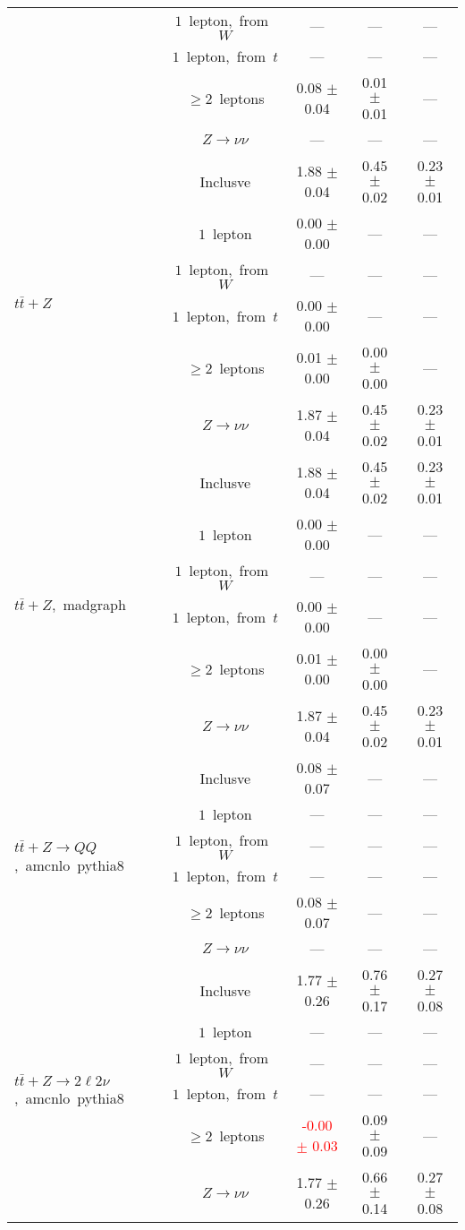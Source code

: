 \documentclass{article}
\begin{document}
\begin{longtable}{|l|c|c|c|c|}
 & $1$~lepton,~from~$W$  & ---  & ---  & --- \\* 
 & $1$~lepton,~from~$t$  & ---  & ---  & --- \\* 
 & $\ge2$~leptons  & 0.08 $\pm$ 0.04  & 0.01 $\pm$ 0.01  & --- \\* 
 & $Z\rightarrow\nu\nu$  & ---  & ---  & --- \\* 
\hline 
\multirow{6}{*}{$t\bar{t}+Z$} & Inclusve  & 1.88 $\pm$ 0.04  & 0.45 $\pm$ 0.02  & 0.23 $\pm$ 0.01 \\* 
 & $1$~lepton  & 0.00 $\pm$ 0.00  & ---  & --- \\* 
 & $1$~lepton,~from~$W$  & ---  & ---  & --- \\* 
 & $1$~lepton,~from~$t$  & 0.00 $\pm$ 0.00  & ---  & --- \\* 
 & $\ge2$~leptons  & 0.01 $\pm$ 0.00  & 0.00 $\pm$ 0.00  & --- \\* 
 & $Z\rightarrow\nu\nu$  & 1.87 $\pm$ 0.04  & 0.45 $\pm$ 0.02  & 0.23 $\pm$ 0.01 \\* 
\hline 
\multirow{6}{*}{$t\bar{t}+Z$,~madgraph} & Inclusve  & 1.88 $\pm$ 0.04  & 0.45 $\pm$ 0.02  & 0.23 $\pm$ 0.01 \\* 
 & $1$~lepton  & 0.00 $\pm$ 0.00  & ---  & --- \\* 
 & $1$~lepton,~from~$W$  & ---  & ---  & --- \\* 
 & $1$~lepton,~from~$t$  & 0.00 $\pm$ 0.00  & ---  & --- \\* 
 & $\ge2$~leptons  & 0.01 $\pm$ 0.00  & 0.00 $\pm$ 0.00  & --- \\* 
 & $Z\rightarrow\nu\nu$  & 1.87 $\pm$ 0.04  & 0.45 $\pm$ 0.02  & 0.23 $\pm$ 0.01 \\* 
\hline 
\multirow{6}{*}{$t\bar{t}+Z{\rightarrow}QQ$,~amcnlo~pythia8} & Inclusve  & 0.08 $\pm$ 0.07  & ---  & --- \\* 
 & $1$~lepton  & ---  & ---  & --- \\* 
 & $1$~lepton,~from~$W$  & ---  & ---  & --- \\* 
 & $1$~lepton,~from~$t$  & ---  & ---  & --- \\* 
 & $\ge2$~leptons  & 0.08 $\pm$ 0.07  & ---  & --- \\* 
 & $Z\rightarrow\nu\nu$  & ---  & ---  & --- \\* 
\hline 
\multirow{6}{*}{$t\bar{t}+Z{\rightarrow}2{\ell}2{\nu}$,~amcnlo~pythia8} & Inclusve  & 1.77 $\pm$ 0.26  & 0.76 $\pm$ 0.17  & 0.27 $\pm$ 0.08 \\* 
 & $1$~lepton  & ---  & ---  & --- \\* 
 & $1$~lepton,~from~$W$  & ---  & ---  & --- \\* 
 & $1$~lepton,~from~$t$  & ---  & ---  & --- \\* 
 & $\ge2$~leptons  & \textcolor{red}{ -0.00 $\pm$ 0.03 }  & 0.09 $\pm$ 0.09  & --- \\* 
 & $Z\rightarrow\nu\nu$  & 1.77 $\pm$ 0.26  & 0.66 $\pm$ 0.14  & 0.27 $\pm$ 0.08 \\* 
\hline 
\end{longtable} 
\end{document}
